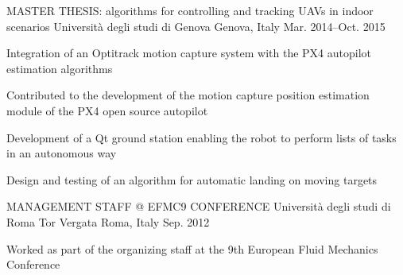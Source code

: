 \begin{cventries}
  
  \cventry
    {MASTER THESIS: algorithms for controlling and tracking UAVs in indoor scenarios} %
    {Università degli studi di Genova} %
    {Genova, Italy} %
    {Mar. 2014–Oct. 2015} %
    {
      \begin{cvitems} %
        \item {Integration of an Optitrack motion capture system with the PX4 autopilot estimation algorithms}
        \item {Contributed to the development of the motion capture position estimation module of the PX4 open source autopilot}
        \item {Development of a Qt ground station enabling the robot to perform lists of tasks in an autonomous way}
        \item {Design and testing of an algorithm for automatic landing on moving targets}
      \end{cvitems}
    }
  \cventry
    {MANAGEMENT STAFF @ EFMC9 CONFERENCE} %
    {Università degli studi di Roma Tor Vergata} %
    {Roma, Italy} %
    {Sep. 2012} %
    {
      \begin{cvitems} %
        \item {Worked as part of the organizing staff at the 9th European Fluid Mechanics Conference}
      \end{cvitems}
    }

\end{cventries}
